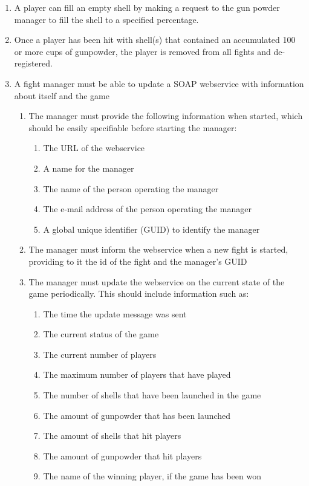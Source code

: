 \documentclass[12pt]{article}
\begin{document}
\begin{enumerate}
	\item{A player can fill an empty shell by making a request to the gun powder manager to fill the shell to a specified percentage.}
	
	\item{Once a player has been hit with shell(s) that contained an accumulated 100 or more cups of gunpowder, the player is removed from all fights and de-registered.}
	
	\item{A fight manager must be able to update a SOAP webservice with information about itself and the game}
	\begin{enumerate}
		\item{The manager must provide the following information when started, which should be easily specifiable before starting the manager:}
		\begin{enumerate}
			\item{The URL of the webservice}
			\item{A name for the manager}
			\item{The name of the person operating the manager}
			\item{The e-mail address of the person operating the manager}
			\item{A global unique identifier (GUID) to identify the manager}
		\end{enumerate}
		\item{The manager must inform the webservice when a new fight is started, providing to it the id of the fight and the manager's GUID}
		\item{The manager must update the webservice on the current state of the game periodically. This should include information such as:}
		\begin{enumerate}
			\item{The time the update message was sent}
			\item{The current status of the game}
			\item{The current number of players}
			\item{The maximum number of players that have played}
			\item{The number of shells that have been launched in the game}
			\item{The amount of gunpowder that has been launched}
			\item{The amount of shells that hit players}
			\item{The amount of gunpowder that hit players}
			\item{The name of the winning player, if the game has been won}
		\end{enumerate}
	\end{enumerate}
\end{enumerate}
\end{document}
